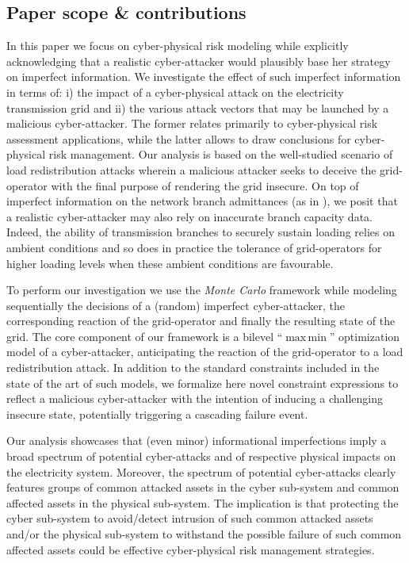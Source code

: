 \documentclass{IEEEtran4PSCC}
\DeclareMathOperator*{\maxmin}{max\,min}
\begin{document}
\subsection{Paper scope \& contributions}

In this paper we focus on cyber-physical risk modeling while explicitly acknowledging that a realistic cyber-attacker would plausibly base her strategy on imperfect information.  We investigate the effect of such imperfect information in terms of: i) the impact of a cyber-physical attack on the electricity transmission grid and ii) the various attack vectors that may  be launched by a malicious cyber-attacker. The former relates primarily to cyber-physical risk assessment applications, while the latter allows to draw conclusions for cyber-physical risk management. Our analysis is based on the well-studied scenario of load redistribution attacks wherein a malicious attacker seeks to deceive the grid-operator with the final purpose of rendering the grid insecure. On top of imperfect information on the network branch admittances (as in \cite{rahman2012}), we posit that a realistic cyber-attacker may also rely on inaccurate branch capacity data. Indeed, the ability of transmission branches to securely sustain loading relies on ambient conditions and so does in practice the tolerance of grid-operators for higher loading levels  {when these ambient conditions are favourable}.  

To perform our investigation we use the \emph{Monte Carlo}  framework while modeling sequentially the decisions of a (random) imperfect cyber-attacker, the corresponding reaction of the grid-operator and finally the resulting state of the grid. The core component of our framework is a bilevel   {``$\maxmin$''} optimization model of a cyber-attacker, anticipating the reaction of the grid-operator to a load redistribution attack.  In addition to the standard constraints included in the  {state of the art} of such models, we formalize here novel constraint expressions to reflect a malicious cyber-attacker with the intention of inducing  a challenging insecure state,  potentially triggering a cascading failure event. 


Our analysis showcases that (even minor) informational imperfections imply a broad spectrum of potential cyber-attacks and of respective physical impacts on the electricity system.  Moreover, the spectrum of potential cyber-attacks clearly features groups of common  attacked assets in the cyber sub-system and common affected assets in the physical sub-system. The implication is that protecting the cyber sub-system to avoid/detect intrusion of such common  attacked assets and/or the physical sub-system to withstand the possible failure of such common affected assets  {could} be effective cyber-physical risk management strategies.
\end{document}
